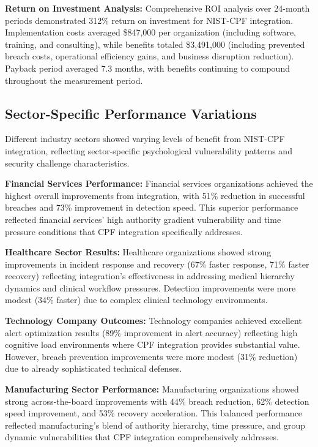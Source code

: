 \documentclass[10pt, twocolumn]{article}
\begin{document}
\textbf{Return on Investment Analysis:} Comprehensive ROI analysis over 24-month periods demonstrated 312\% return on investment for NIST-CPF integration. Implementation costs averaged \$847,000 per organization (including software, training, and consulting), while benefits totaled \$3,491,000 (including prevented breach costs, operational efficiency gains, and business disruption reduction). Payback period averaged 7.3 months, with benefits continuing to compound throughout the measurement period.

\subsection{Sector-Specific Performance Variations}

Different industry sectors showed varying levels of benefit from NIST-CPF integration, reflecting sector-specific psychological vulnerability patterns and security challenge characteristics.

\textbf{Financial Services Performance:} Financial services organizations achieved the highest overall improvements from integration, with 51\% reduction in successful breaches and 73\% improvement in detection speed. This superior performance reflected financial services' high authority gradient vulnerability and time pressure conditions that CPF integration specifically addresses.

\textbf{Healthcare Sector Results:} Healthcare organizations showed strong improvements in incident response and recovery (67\% faster response, 71\% faster recovery) reflecting integration's effectiveness in addressing medical hierarchy dynamics and clinical workflow pressures. Detection improvements were more modest (34\% faster) due to complex clinical technology environments.

\textbf{Technology Company Outcomes:} Technology companies achieved excellent alert optimization results (89\% improvement in alert accuracy) reflecting high cognitive load environments where CPF integration provides substantial value. However, breach prevention improvements were more modest (31\% reduction) due to already sophisticated technical defenses.

\textbf{Manufacturing Sector Performance:} Manufacturing organizations showed strong across-the-board improvements with 44\% breach reduction, 62\% detection speed improvement, and 53\% recovery acceleration. This balanced performance reflected manufacturing's blend of authority hierarchy, time pressure, and group dynamic vulnerabilities that CPF integration comprehensively addresses.
\end{document}
